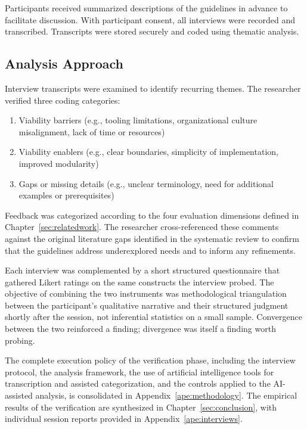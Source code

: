 Participants received summarized descriptions of the guidelines in advance to facilitate discussion. With participant consent, all interviews were recorded and transcribed. Transcripts were stored securely and coded using thematic analysis.

\subsection*{Analysis Approach}

Interview transcripts were examined to identify recurring themes. The researcher verified three coding categories:

\begin{enumerate}[itemsep=8pt,topsep=2pt]
  \item Viability barriers (e.g., tooling limitations, organizational culture misalignment, lack of time or resources)
  \item Viability enablers (e.g., clear boundaries, simplicity of implementation, improved modularity)
  \item Gaps or missing details (e.g., unclear terminology, need for additional examples or prerequisites)
\end{enumerate}

Feedback was categorized according to the four evaluation dimensions defined in Chapter~\ref{sec:relatedwork}. The researcher cross-referenced these comments against the original literature gaps identified in the systematic review to confirm that the guidelines address underexplored needs and to inform any refinements.

Each interview was complemented by a short structured questionnaire that gathered Likert ratings on the same constructs the interview probed. The objective of combining the two instruments was methodological triangulation between the participant's qualitative narrative and their structured judgment shortly after the session, not inferential statistics on a small sample. Convergence between the two reinforced a finding; divergence was itself a finding worth probing.

The complete execution policy of the verification phase, including the interview protocol, the analysis framework, the use of artificial intelligence tools for transcription and assisted categorization, and the controls applied to the AI-assisted analysis, is consolidated in Appendix~\ref{ape:methodology}. The empirical results of the verification are synthesized in Chapter~\ref{sec:conclusion}, with individual session reports provided in Appendix~\ref{ape:interviews}.
